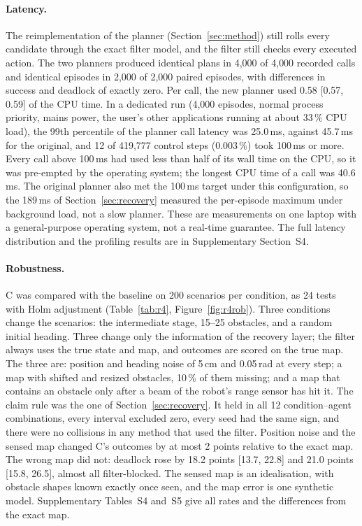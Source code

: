 \documentclass[11pt]{article}
\theoremstyle{definition}
\theoremstyle{remark}
\begin{document}
\paragraph{Latency.} The reimplementation of the planner (Section~\ref{sec:method}) still rolls every candidate through the exact filter model, and the filter still checks every executed action. The two planners produced identical plans in 4{,}000 of 4{,}000 recorded calls and identical episodes in 2{,}000 of 2{,}000 paired episodes, with differences in success and deadlock of exactly zero. Per call, the new planner used 0.58 [0.57, 0.59] of the CPU time. In a dedicated run (4{,}000 episodes, normal process priority, mains power, the user's other applications running at about 33\,\% CPU load), the 99th percentile of the planner call latency was 25.0\,ms, against 45.7\,ms for the original, and 12 of 419{,}777 control steps (0.003\,\%) took 100\,ms or more. Every call above 100\,ms had used less than half of its wall time on the CPU, so it was pre-empted by the operating system; the longest CPU time of a call was 40.6\,ms. The original planner also met the 100\,ms target under this configuration, so the 189\,ms of Section~\ref{sec:recovery} measured the per-episode maximum under background load, not a slow planner. These are measurements on one laptop with a general-purpose operating system, not a real-time guarantee. The full latency distribution and the profiling results are in Supplementary Section~S4.

\paragraph{Robustness.} C was compared with the baseline on 200 scenarios per condition, as 24 tests with Holm adjustment (Table~\ref{tab:r4}, Figure~\ref{fig:r4rob}). Three conditions change the scenarios: the intermediate stage, 15--25 obstacles, and a random initial heading. Three change only the information of the recovery layer; the filter always uses the true state and map, and outcomes are scored on the true map. The three are: position and heading noise of 5\,cm and 0.05\,rad at every step; a map with shifted and resized obstacles, 10\,\% of them missing; and a map that contains an obstacle only after a beam of the robot's range sensor has hit it. The claim rule was the one of Section~\ref{sec:recovery}. It held in all 12 condition--agent combinations, every interval excluded zero, every seed had the same sign, and there were no collisions in any method that used the filter. Position noise and the sensed map changed C's outcomes by at most 2 points relative to the exact map. The wrong map did not: deadlock rose by 18.2 points [13.7, 22.8] and 21.0 points [15.8, 26.5], almost all filter-blocked. The sensed map is an idealisation, with obstacle shapes known exactly once seen, and the map error is one synthetic model. Supplementary Tables~S4 and~S5 give all rates and the differences from the exact map.
\end{document}
